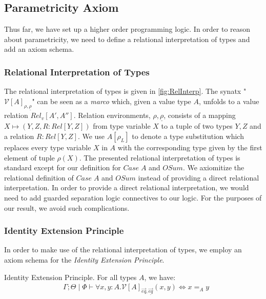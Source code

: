 \documentclass[acmsmall]{acmart}
\newcommand{\eric}[1]{\textcolor{red}{ <eric-#1> }}
\begin{document}



\subsection{Parametricity Axiom}
Thus far, we have set up a higher order programming logic. In order to reason about parametricity, we need to define a relational interpretation of types and add an axiom schema.

\subsubsection{Relational Interpretation of Types}
The relational interpretation of types is given in \cref{fig:RelInterp}.  The synatx "$\mathcal{V}[A]_{\rho,\underline{\rho}}$"  can be seen as a \emph{marco} which, given a value type $A$, unfolds to a value relation $Rel_v[A',A'']$. Relation environments, $\rho,\underline{\rho}$, consists of a mapping $X\mapsto (Y,Z,R : Rel[Y,Z])$ from type variable $X$ to a tuple of two types $Y,Z$ and a relation $R : Rel[Y,Z]$. We use $A[\rho_L]$ to denote a type substitution which replaces every type variable $X$ in $A$ with the corresponding type given by the first element of tuple $\rho(X)$. The presented relational interpretation of types is standard except for our definition for $Case\;A$ and $OSum$. We axiomitize the relational definition of $Case\;A$ and $OSum$ instead of providing a direct relational interpretation. In order to provide a direct relational interpretation, we would need to add guarded separation logic connectives to our logic. For the purposes of our result, we avoid such complications.

\subsubsection{Identity Extension Principle}
In order to make use of the relational interpretation of types, we employ an axiom schema for the \emph{Identity Extension Principle}.

\begin{definition}
  Identity Extension Principle. For all types $A$, we have:
  \begin{align*}
    &  \Gamma ; \Theta \;|\; \Phi \vdash \forall x,y : A. \mathcal{V}[A]_{\overrightarrow{eq},\underline{\overrightarrow{eq}}}(x,y) \iff x =_A y  \\ 
  \end{align*}
\end{definition}
\end{document}
